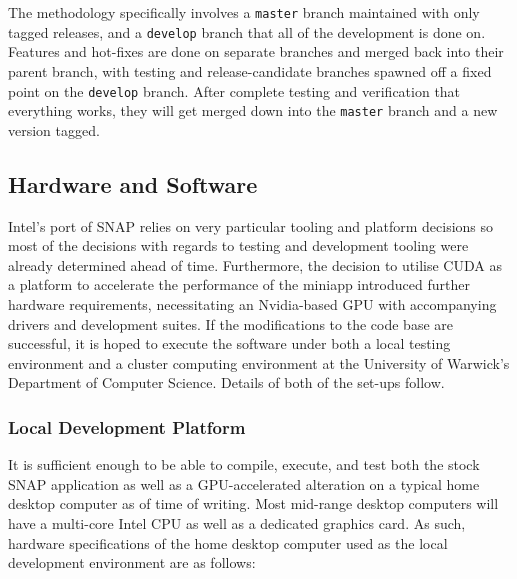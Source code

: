 \documentclass[conference]{IEEEtran}
\begin{document}
The methodology specifically involves a \texttt{master} branch maintained with only tagged releases, and a \texttt{develop} branch that all of the development is done on. Features and hot-fixes are done on separate branches and merged back into their parent branch, with testing and release-candidate branches spawned off a fixed point on the \texttt{develop} branch. After complete testing and verification that everything works, they will get merged down into the \texttt{master} branch and a new version tagged.

\subsection{Hardware and Software}

Intel's port of SNAP relies on very particular tooling and platform decisions so most of the decisions with regards to testing and development tooling were already determined ahead of time. Furthermore, the decision to utilise CUDA as a platform to accelerate the performance of the miniapp introduced further hardware requirements, necessitating an Nvidia-based GPU with accompanying drivers and development suites. If the modifications to the code base are successful, it is hoped to execute the software under both a local testing environment and a cluster computing environment at the University of Warwick's Department of Computer Science. Details of both of the set-ups follow.

\subsubsection{Local Development Platform}
\label{subsubsec:projmgmt_localtesting}

It is sufficient enough to be able to compile, execute, and test both the stock SNAP application as well as a GPU-accelerated alteration on a typical home desktop computer as of time of writing. Most mid-range desktop computers will have a multi-core Intel CPU as well as a dedicated graphics card. As such, hardware specifications of the home desktop computer used as the local development environment are as follows:
\end{document}
